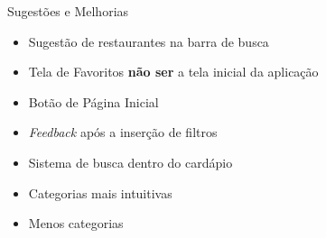 \begin{frame}{Sugestões e Melhorias}
	\begin{itemize}
		\setlength{\itemsep}{1em}
		\item<1-> Sugestão de restaurantes na barra de busca
		\item<1-> Tela de Favoritos \textbf{não ser} a tela inicial da aplicação
		\item<1-> Botão de Página Inicial
		\item<1-> \emph{Feedback} após a inserção de filtros
		\item<1-> Sistema de busca dentro do cardápio
		\item<1-> Categorias mais intuitivas
		\item<1-> Menos categorias
	\end{itemize}
\end{frame}
